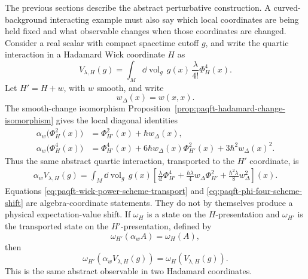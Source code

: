 The previous sections describe the abstract perturbative construction.  A
curved-background interacting example must also say which local coordinates
are being held fixed and what observable changes when those coordinates are
changed.  Consider a real scalar with compact spacetime cutoff \(g\), and
write the quartic interaction in a Hadamard Wick coordinate \(H\) as
\begin{equation}
  V_{\lambda,H}(g)
  =
  \int_M \dd\operatorname{vol}_g\,
  g(x)\,\frac{\lambda}{4!}\Phi_H^4(x).
  \label{eq:paqft-lambda-phi-four-interaction-coordinate}
\end{equation}
Let \(H'=H+w\), with \(w\) smooth, and write
\[
  w_\Delta(x)=w(x,x).
\]
The smooth-change isomorphism
Proposition~\ref{prop:paqft-hadamard-change-isomorphism} gives the local
diagonal identities
\begin{equation}
\begin{aligned}
  \alpha_w\bigl(\Phi_H^2(x)\bigr)
  &=
  \Phi_{H'}^2(x)+\hbar w_\Delta(x),\\
  \alpha_w\bigl(\Phi_H^4(x)\bigr)
  &=
  \Phi_{H'}^4(x)
  +6\hbar w_\Delta(x)\Phi_{H'}^2(x)
  +3\hbar^2w_\Delta(x)^2 .
\end{aligned}
  \label{eq:paqft-wick-power-scheme-transport}
\end{equation}
Thus the same abstract quartic interaction, transported to the \(H'\)
coordinate, is
\begin{equation}
\begin{aligned}
  \alpha_w V_{\lambda,H}(g)
  =
  \int_M\dd\operatorname{vol}_g\,g(x)
  \left[
    \frac{\lambda}{4!}\Phi_{H'}^4
    +\frac{\hbar\lambda}{4}w_\Delta\Phi_{H'}^2
    +\frac{\hbar^2\lambda}{8}w_\Delta^2
  \right](x).
\end{aligned}
  \label{eq:paqft-phi-four-scheme-shift}
\end{equation}
Equations \eqref{eq:paqft-wick-power-scheme-transport} and
\eqref{eq:paqft-phi-four-scheme-shift} are algebra-coordinate statements.
They do not by themselves produce a physical expectation-value shift.  If
\(\omega_H\) is a state on the \(H\)-presentation and \(\omega_{H'}\) is the
transported state on the \(H'\)-presentation, defined by
\[
  \omega_{H'}(\alpha_w A)=\omega_H(A),
\]
then
\[
  \omega_{H'}\!\left(\alpha_w V_{\lambda,H}(g)\right)
  =
  \omega_H\!\left(V_{\lambda,H}(g)\right).
\]
This is the same abstract observable in two Hadamard coordinates.


